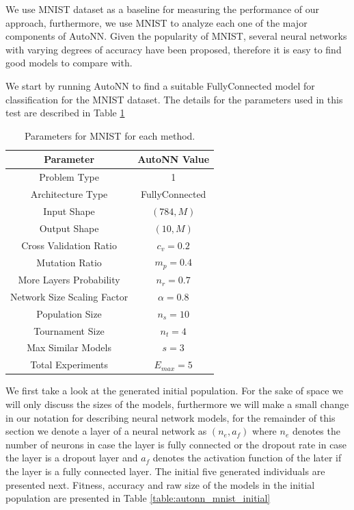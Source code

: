 \documentclass[journal]{IEEEtran}
\begin{document}
We use MNIST dataset as a baseline for measuring the performance of our approach, furthermore, we use MNIST to analyze each one of the major components of AutoNN. Given the popularity of MNIST, several neural networks with varying degrees of accuracy have been proposed, therefore it is easy to find good models to compare with. 

We start by running AutoNN to find a suitable FullyConnected model for classification for the MNIST dataset. The details for the parameters used in this test are described in Table \ref{table:MNIST_params}

\begin{table}[!htb]
\begin{center}
\begin{tabular}{| c | c |}
\hline
Parameter & AutoNN Value \\
\hline
Problem Type & 1 \\
Architecture Type & FullyConnected \\
Input Shape & $(784, M)$  \\
Output Shape & $(10, M)$ \\
Cross Validation Ratio & $c_v = 0.2$ \\
Mutation Ratio & $m_p = 0.4$ \\
More Layers Probability & $n_r = 0.7$ \\
Network Size Scaling Factor & $\alpha = 0.8$ \\
Population Size & $n_s = 10$ \\
Tournament Size & $n_t = 4$ \\
Max Similar Models & $s = 3$ \\
Total Experiments & $E_{max} = 5$ \\
\hline
\end{tabular}
\end{center}
\caption{Parameters for MNIST for each method.}
\label{table:MNIST_params}
\end{table}

We first take a look at the generated initial population. For the sake of space we will only discuss the sizes of the models, furthermore we will make a small change in our notation for describing neural network models, for the remainder of this section we denote a layer of a neural network as $(n_e, a_f)$ where $n_e$ denotes the number of neurons in case the layer is fully connected or the dropout rate in case the layer is a dropout layer and $a_f$ denotes the activation function of the later if the layer is a fully connected layer. The initial five generated individuals are presented next. Fitness, accuracy and raw size of the models in the initial population are presented in Table \ref{table:autonn_mnist_initial}
\end{document}
